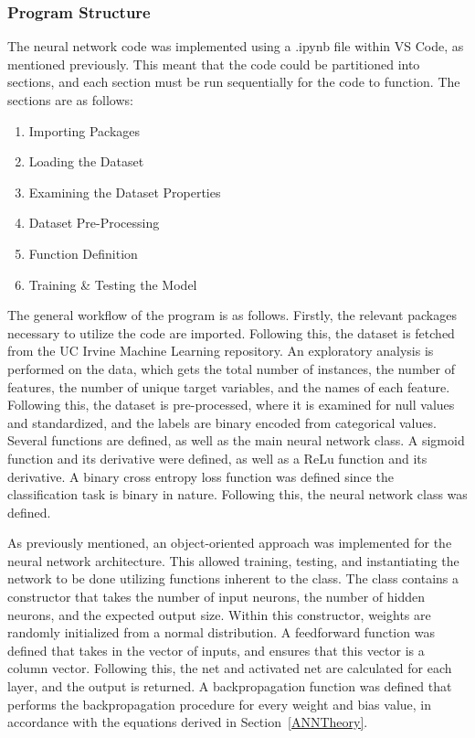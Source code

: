 \documentclass[a4paper]{article}
\begin{document}
\subsubsection{Program Structure}

The neural network code was implemented using a .ipynb file within VS Code, as mentioned previously. This meant that the code could be partitioned into sections, and each section must be run sequentially for the code to function. The sections are as follows:

\begin{enumerate}
    \item Importing Packages
    \item Loading the Dataset
    \item Examining the Dataset Properties
    \item Dataset Pre-Processing
    \item Function Definition
    \item Training \& Testing the Model
\end{enumerate}

The general workflow of the program is as follows. Firstly, the relevant packages necessary to utilize the code are imported. Following this, the dataset is fetched from the UC Irvine Machine Learning repository. An exploratory analysis is performed on the data, which gets the total number of instances, the number of features, the number of unique target variables, and the names of each feature. Following this, the dataset is pre-processed, where it is examined for null values and standardized, and the labels are binary encoded from categorical values. Several functions are defined, as well as the main neural network class. A sigmoid function and its derivative were defined, as well as a ReLu function and its derivative. A binary cross entropy loss function was defined since the classification task is binary in nature. Following this, the neural network class was defined.

As previously mentioned, an object-oriented approach was implemented for the neural network architecture. This allowed training, testing, and instantiating the network to be done utilizing functions inherent to the class. The class contains a constructor that takes the number of input neurons, the number of hidden neurons, and the expected output size. Within this constructor, weights are randomly initialized from a normal distribution. A feedforward function was defined that takes in the vector of inputs, and ensures that this vector is a column vector. Following this, the net and activated net are calculated for each layer, and the output is returned. A backpropagation function was defined that performs the backpropagation procedure for every weight and bias value, in accordance with the equations derived in Section~\ref{ANNTheory}.
\end{document}
